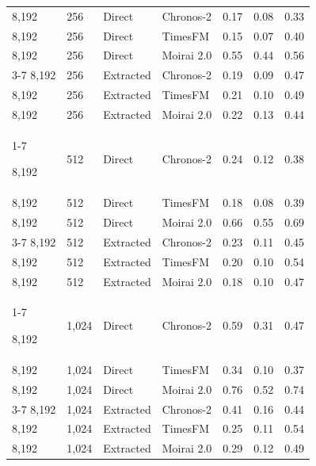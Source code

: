 \begin{longtable}{ll ll ccc}
\midrule

8,192 & 256 & Direct & Chronos-2 & 0.17 & 0.08 & 0.33 \\
8,192 & 256 & Direct & TimesFM & 0.15 & 0.07 & 0.40 \\
8,192 & 256 & Direct & Moirai 2.0 & 0.55 & 0.44 & 0.56 \\
\cmidrule(lr){3-7}
8,192 & 256 & Extracted & Chronos-2 & 0.19 & 0.09 & 0.47 \\
8,192 & 256 & Extracted & TimesFM & 0.21 & 0.10 & 0.49 \\
8,192 & 256 & Extracted & Moirai 2.0 & 0.22 & 0.13 & 0.44 \\
\cmidrule(lr){1-7}

8,192 & 512 & Direct & Chronos-2 & 0.24 & 0.12 & 0.38 \\
8,192 & 512 & Direct & TimesFM & 0.18 & 0.08 & 0.39 \\
8,192 & 512 & Direct & Moirai 2.0 & 0.66 & 0.55 & 0.69 \\
\cmidrule(lr){3-7}
8,192 & 512 & Extracted & Chronos-2 & 0.23 & 0.11 & 0.45 \\
8,192 & 512 & Extracted & TimesFM & 0.20 & 0.10 & 0.54 \\
8,192 & 512 & Extracted & Moirai 2.0 & 0.18 & 0.10 & 0.47 \\
\cmidrule(lr){1-7}

8,192 & 1,024 & Direct & Chronos-2 & 0.59 & 0.31 & 0.47 \\
8,192 & 1,024 & Direct & TimesFM & 0.34 & 0.10 & 0.37 \\
8,192 & 1,024 & Direct & Moirai 2.0 & 0.76 & 0.52 & 0.74 \\
\cmidrule(lr){3-7}
8,192 & 1,024 & Extracted & Chronos-2 & 0.41 & 0.16 & 0.44 \\
8,192 & 1,024 & Extracted & TimesFM & 0.25 & 0.11 & 0.54 \\
8,192 & 1,024 & Extracted & Moirai 2.0 & 0.29 & 0.12 & 0.49 \\
\end{longtable}
